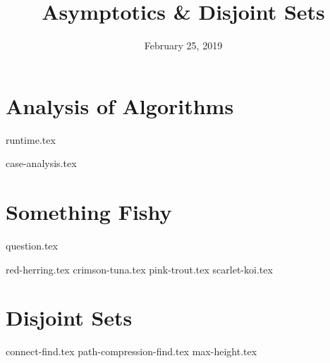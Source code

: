 \documentclass[11pt]{exam}
\title{Asymptotics \& Disjoint Sets}
\date{February 25, 2019}
\begin{document}
\maketitle

\section{Analysis of Algorithms}
{runtime.tex}
\begin{questions}
{case-analysis.tex}
\end{questions}

\clearpage

\section{Something Fishy}
{question.tex}
\begin{questions}
{red-herring.tex}
{crimson-tuna.tex}
{pink-trout.tex}
{scarlet-koi.tex}
\end{questions}

\clearpage
\section{Disjoint Sets}
\begin{questions}
{connect-find.tex}
{path-compression-find.tex}
{max-height.tex}
\end{questions}

\clearpage
\end{document}
